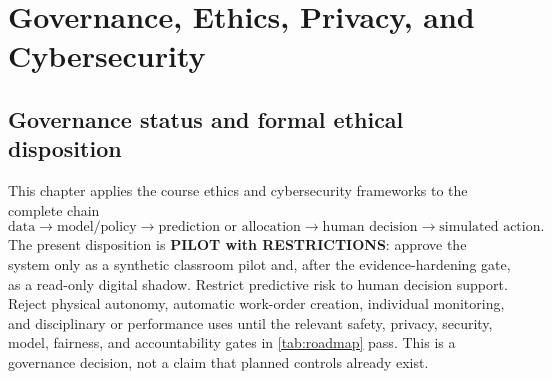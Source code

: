 \chapter{Governance, Ethics, Privacy, and Cybersecurity}
\label{ch:governance}

\section{Governance status and formal ethical disposition}
This chapter applies the course ethics and cybersecurity frameworks to the complete chain
\begin{equation}
\text{data}\rightarrow\text{model/policy}\rightarrow\text{prediction or allocation}\rightarrow\text{human decision}\rightarrow\text{simulated action}.
\end{equation}
The present disposition is \textbf{PILOT with RESTRICTIONS}: approve the system only as a synthetic classroom pilot and, after the evidence-hardening gate, as a read-only digital shadow. Restrict predictive risk to human decision support. Reject physical autonomy, automatic work-order creation, individual monitoring, and disciplinary or performance uses until the relevant safety, privacy, security, model, fairness, and accountability gates in \cref{tab:roadmap} pass. This is a governance decision, not a claim that planned controls already exist.

